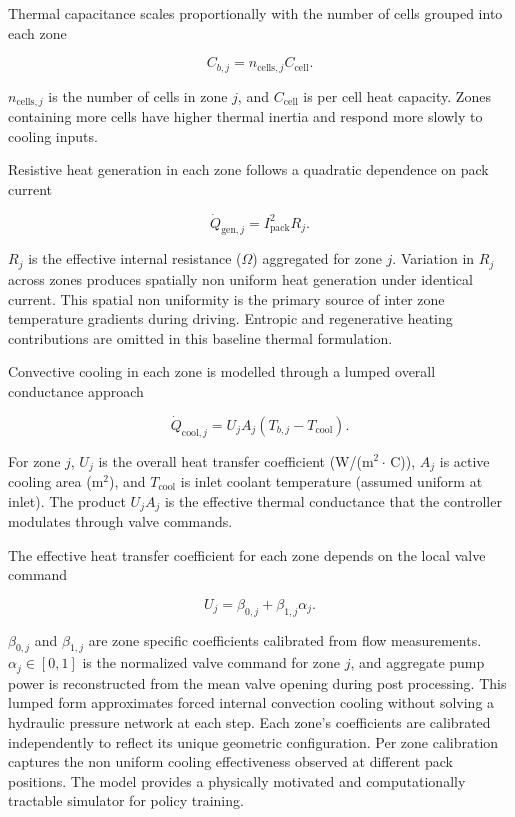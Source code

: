\documentclass[twocolumn]{article}
\begin{document}
Thermal capacitance scales proportionally with the number of cells grouped into each zone

\begin{equation}
C_{b,j} = n_{\mathrm{cells},j} C_{\mathrm{cell}}. \label{eq:capacitance}
\end{equation}

$n_{\mathrm{cells},j}$ is the number of cells in zone $j$, and $C_{\mathrm{cell}}$ is per cell heat capacity. Zones containing more cells have higher thermal inertia and respond more slowly to cooling inputs.

Resistive heat generation in each zone follows a quadratic dependence on pack current

\begin{equation}
\dot Q_{\mathrm{gen},j} = I_{\mathrm{pack}}^2 R_j. \label{eq:heat_gen}
\end{equation}

$R_j$ is the effective internal resistance ($\Omega$) aggregated for zone $j$. Variation in $R_j$ across zones produces spatially non uniform heat generation under identical current. This spatial non uniformity is the primary source of inter zone temperature gradients during driving. Entropic and regenerative heating contributions are omitted in this baseline thermal formulation.

Convective cooling in each zone is modelled through a lumped overall conductance approach

\begin{equation}
\dot Q_{\mathrm{cool},j} = U_j A_j (T_{b,j} - T_{\mathrm{cool}}). \label{eq:cooling}
\end{equation}

For zone $j$, $U_j$ is the overall heat transfer coefficient (W/(m$^2\cdot$\,\textdegree{}C)), $A_j$ is active cooling area (m$^2$), and $T_{\mathrm{cool}}$ is inlet coolant temperature (assumed uniform at inlet). The product $U_j A_j$ is the effective thermal conductance that the controller modulates through valve commands.

The effective heat transfer coefficient for each zone depends on the local valve command

\begin{equation}
U_j = \beta_{0,j} + \beta_{1,j} \alpha_j. \label{eq:heat_coeff}
\end{equation}

$\beta_{0,j}$ and $\beta_{1,j}$ are zone specific coefficients calibrated from flow measurements. $\alpha_j \in [0, 1]$ is the normalized valve command for zone $j$, and aggregate pump power is reconstructed from the mean valve opening during post processing. This lumped form approximates forced internal convection cooling without solving a hydraulic pressure network at each step. Each zone's coefficients are calibrated independently to reflect its unique geometric configuration. Per zone calibration captures the non uniform cooling effectiveness observed at different pack positions. The model provides a physically motivated and computationally tractable simulator for policy training.
\end{document}
